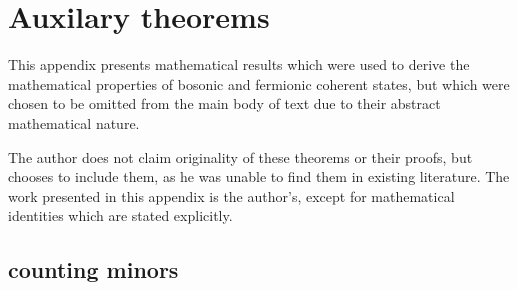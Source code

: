 \chapter{Auxilary theorems}
This appendix presents mathematical results which were used to derive the mathematical properties of bosonic and fermionic coherent states, but which were chosen to be omitted from the main body of text due to their abstract mathematical nature.

The author does not claim originality of these theorems or their proofs, but chooses to include them, as he was unable to find them in existing literature. The work presented in this appendix is the author's, except for mathematical identities which are stated explicitly.

\section{counting minors}